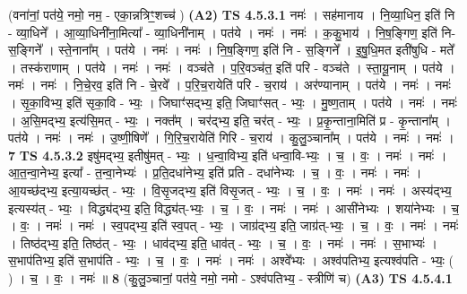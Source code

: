 \documentclass[17pt]{extarticle}
\begin{document}
                  \newline
                      (वना॑नां॒ पत॑ये॒ नमो॒ नम॒ - एका॒न्नत्रिꣳ॒॒शच्च॑ )  \textbf{(A2)} \newline \newline
                                \textbf{ TS 4.5.3.1} \newline
                  नमः॑ । सह॑मानाय । नि॒व्या॒धिन॒ इति॑ नि - व्या॒धिने᳚ । आ॒व्या॒धिनी॑ना॒मित्या᳚ - व्या॒धिनी॑नाम् । पत॑ये । नमः॑ । नमः॑ । क॒कु॒भाय॑ । नि॒ष॒ङ्गिण॒ इति॑ नि-स॒ङ्गिने᳚ । स्ते॒नाना᳚म् । पत॑ये । नमः॑ । नमः॑ । नि॒ष॒ङ्गिण॒ इति॑ नि - स॒ङ्गिने᳚ । इ॒षु॒धि॒मत इती॑षुधि - मते᳚ । तस्क॑राणाम् । पत॑ये । नमः॑ । नमः॑ । वञ्च॑ते । प॒रि॒वञ्च॑त॒ इति॑ परि - वञ्च॑ते । स्ता॒यू॒नाम् । पत॑ये । नमः॑ । नमः॑ । नि॒चे॒रव॒ इति॑ नि - चे॒रवे᳚ । प॒रि॒च॒रायेति॑ परि - च॒राय॑ । अर॑ण्यानाम् । पत॑ये । नमः॑ । नमः॑ । सृ॒का॒विभ्य॒ इति॑ सृका॒वि - भ्यः॒ । जिघाꣳ॑सद्भ्य॒ इति॒ जिघाꣳ॑सत् - भ्यः॒ । मु॒ष्ण॒ताम् । पत॑ये । नमः॑ । नमः॑ । अ॒सि॒मद्भ्य॒ इत्य॑सि॒मत् - भ्यः॒ । नक्त᳚म् । चर॑द्भ्य॒ इति॒ चर॑त् - भ्यः॒ । प्र॒कृ॒न्ताना॒मिति॑ प्र - कृ॒न्ताना᳚म् । पत॑ये । नमः॑ । नमः॑ । उ॒ष्णी॒षिणे᳚ । गि॒रि॒च॒रायेति॑ गिरि - च॒राय॑ । कु॒लु॒ञ्चाना᳚म् । पत॑ये । नमः॑ । नमः॑ । \textbf{  7} \newline
                  \newline
                                \textbf{ TS 4.5.3.2} \newline
                  इषु॑मद्भ्य॒ इतीषु॑मत् - भ्यः॒ । ध॒न्वा॒विभ्य॒ इति॑ धन्वा॒वि-भ्यः॒ । च॒ । वः॒ । नमः॑ । नमः॑ । आ॒त॒न्वा॒नेभ्य॒ इत्या᳚ - त॒न्वा॒नेभ्यः॑ । प्र॒ति॒दधा॑नेभ्य॒ इति॑ प्रति - दधा॑नेभ्यः । च॒ । वः॒ । नमः॑ । नमः॑ । आ॒यच्छ॑द्भ्य॒ इत्या॒यच्छ॑त् - भ्यः॒ । वि॒सृ॒जद्भ्य॒ इति॑ विसृ॒जत् - भ्यः॒ । च॒ । वः॒ । नमः॑ । नमः॑ । अस्य॑द्भ्य॒ इत्यस्य॑त् - भ्यः॒ । विद्ध्य॑द्भ्य॒ इति॒ विद्ध्य॑त्-भ्यः॒ । च॒ । वः॒ । नमः॑ । नमः॑ । आसी॑नेभ्यः । शया॑नेभ्यः । च॒ । वः॒ । नमः॑ । नमः॑ । स्व॒पद्भ्य॒ इति॑ स्व॒पत् - भ्यः॒ । जाग्र॑द्भ्य॒ इति॒ जाग्र॑त्-भ्यः॒ । च॒ । वः॒ । नमः॑ । नमः॑ । तिष्ठ॑द्भ्य॒ इति॒ तिष्ठ॑त् - भ्यः॒ । धाव॑द्भ्य॒ इति॒ धाव॑त् - भ्यः॒ । च॒ । वः॒ । नमः॑ । नमः॑ । स॒भाभ्यः॑ । स॒भाप॑तिभ्य॒ इति॑ स॒भाप॑ति - भ्यः॒ । च॒ । वः॒ । नमः॑ । नमः॑ । अश्वे᳚भ्यः । अश्व॑पतिभ्य॒ इत्यश्व॑पति - भ्यः॒ ( ) । च॒ । वः॒ । नमः॑ ॥ \textbf{  8} \newline
                  \newline
                      (कु॒लु॒ञ्चानां॒ पत॑ये॒ नमो॒ नमो - ऽश्व॑पतिभ्य॒ - स्त्रीणि॑ च)  \textbf{(A3)} \newline \newline
                                \textbf{ TS 4.5.4.1} \newline
\end{document}
